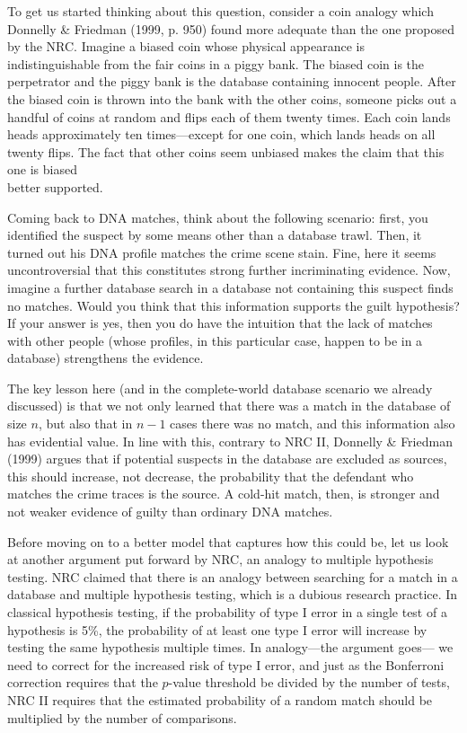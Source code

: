\documentclass[10pt,dvipsnames,enabledeprecatedfontcommands]{scrartcl}
\begin{document}
To get us started thinking about this question, consider a coin analogy
which Donnelly \& Friedman (1999, p. 950) found more adequate than the
one proposed by the NRC. Imagine a biased coin whose physical appearance
is indistinguishable from the fair coins in a piggy bank. The biased
coin is the perpetrator and the piggy bank is the database containing
innocent people. After the biased coin is thrown into the bank with the
other coins, someone picks out a handful of coins at random and flips
each of them twenty times. Each coin lands heads approximately ten
times---except for one coin, which lands heads on all twenty flips. The
fact that other coins seem unbiased makes the claim that this one is
biased\\
better supported.

Coming back to DNA matches, think about the following scenario: first,
you identified the suspect by some means other than a database trawl.
Then, it turned out his DNA profile matches the crime scene stain. Fine,
here it seems uncontroversial that this constitutes strong further
incriminating evidence. Now, imagine a further database search in a
database not containing this suspect finds no matches. Would you think
that this information supports the guilt hypothesis? If your answer is
yes, then you do have the intuition that the lack of matches with other
people (whose profiles, in this particular case, happen to be in a
database) strengthens the evidence.

The key lesson here (and in the complete-world database scenario we
already discussed) is that we not only learned that there was a match in
the database of size \(n\), but also that in \(n-1\) cases there was no
match, and this information also has evidential value. In line with
this, contrary to NRC II, Donnelly \& Friedman (1999) argues that if
potential suspects in the database are excluded as sources, this should
increase, not decrease, the probability that the defendant who matches
the crime traces is the source. A cold-hit match, then, is stronger and
not weaker evidence of guilty than ordinary DNA matches.

Before moving on to a better model that captures how this could be, let
us look at another argument put forward by NRC, an analogy to multiple
hypothesis testing. NRC claimed that there is an analogy between
searching for a match in a database and multiple hypothesis testing,
which is a dubious research practice. In classical hypothesis testing,
if the probability of type I error in a single test of a hypothesis is
5\%, the probability of at least one type I error will increase by
testing the same hypothesis multiple times. In analogy---the argument
goes--- we need to correct for the increased risk of type I error, and
just as the Bonferroni correction requires that the \(p\)-value
threshold be divided by the number of tests, NRC II requires that the
estimated probability of a random match should be multiplied by the
number of comparisons.
\end{document}

